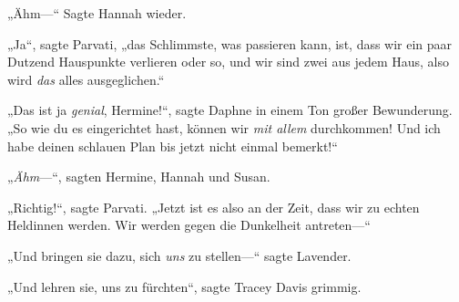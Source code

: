 „Ähm—“ Sagte Hannah wieder.

„Ja“, sagte Parvati, „das Schlimmste, was passieren kann, ist, dass wir ein paar Dutzend Hauspunkte verlieren oder so, und wir sind zwei aus jedem Haus, also wird \emph{das} alles ausgeglichen.“

„Das ist ja \emph{genial}, Hermine!“, sagte Daphne in einem Ton großer Bewunderung. „So wie du es eingerichtet hast, können wir \emph{mit allem} durchkommen! Und ich habe deinen schlauen Plan bis jetzt nicht einmal bemerkt!“

„\emph{Ähm}—“, sagten Hermine, Hannah und Susan.

„Richtig!“, sagte Parvati. „Jetzt ist es also an der Zeit, dass wir zu echten Heldinnen werden. Wir werden gegen die Dunkelheit antreten—“

„Und bringen sie dazu, sich \emph{uns} zu stellen—“ sagte Lavender.

„Und lehren sie, uns zu fürchten“, sagte Tracey Davis grimmig.

